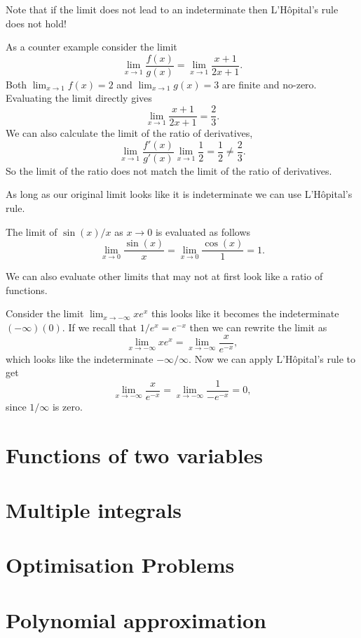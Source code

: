 Note that if the limit does not lead to an indeterminate then L'H\^{o}pital's rule does not hold!

\begin{ex}
As a counter example consider the limit
\begin{equation*}
\lim_{x\to 1}\frac{f(x)}{g(x)}=\lim_{x\to 1}\frac{x+1}{2x+1}.
\end{equation*}
Both $\lim_{x\to 1}f(x)=2$ and $\lim_{x\to1}g(x)=3$ are finite and no-zero. Evaluating the limit directly gives
\begin{equation*}
\lim_{x\to 1}\frac{x+1}{2x+1}=\frac{2}{3}.
\end{equation*}
We can also calculate the limit of the ratio of derivatives,
\begin{equation*}
\lim_{x\to 1}\frac{f'(x)}{g'(x)}\lim_{x\to 1}\frac{1}{2}=\frac{1}{2}\neq \frac{2}{3}.
\end{equation*}
So the limit of the ratio does not match the limit of the ratio of derivatives.
\end{ex}


As long as our original limit looks like it is indeterminate we can use L'H\^{o}pital's rule.

\begin{ex}
The limit of $\sin(x)/x$ as $x\to 0$ is evaluated as follows
\begin{equation*}
\lim_{x\to0}\frac{\sin(x)}{x}=\lim_{x\to0}\frac{\cos(x)}{1}=1.
\end{equation*}
\end{ex}

We can also evaluate other limits that may not at first look like a ratio of functions.
\begin{ex}
Consider the limit $\lim_{x\to-\infty}xe^{x}$ this looks like it becomes the indeterminate $(-\infty)(0)$. If we recall that $1/e^{x}=e^{-x}$ then we can rewrite the limit as
\begin{equation*}
\lim_{x\to-\infty}xe^{x}=\lim_{x\to-\infty}\frac{x}{e^{-x}},
\end{equation*}
which looks like the indeterminate $-\infty/\infty$. Now we can apply L'H\^{o}pital's rule to get
\begin{equation*}
\lim_{x\to-\infty}\frac{x}{e^{-x}}=\lim_{x\to-\infty}\frac{1}{-e^{-x}}=0,
\end{equation*}
since $1/\infty$ is zero.
\end{ex}

\section{Functions of two variables}

\section{Multiple integrals}

\section{Optimisation Problems}

\section{Polynomial approximation}